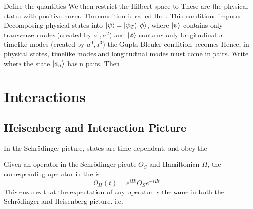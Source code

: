 \documentclass{article}
\begin{document}
\begin{definition}
Define the quantities 
We then restrict the Hilbert space to 
These are the physical states with positive norm. The condition is called the . This conditions imposes 
Decomposing physical states into $\ket{\psi} = \ket{\psi_T}\ket{\phi}$, where $\ket{\psi}$ contains only transverse modes (created by $a^1,a^2$) and $\ket{\phi}$ contains only longitudinal or timelike modes (created by $a^0,a^3$) the Gupta Bleuler condition becomes 
Hence, in physical states, timelike modes and longitudinal modes must come in pairs. Write 
where the state $\ket{\phi_n}$ has n pairs. Then 
\end{definition}

\section{Interactions}

\subsection{Heisenberg and Interaction Picture}

\begin{definition}
In the Schr\"odinger picture, states are time dependent, and obey the 
\end{definition}

\begin{definition}
Given an operator in the Schr\"odinger picute $O_S$ and Hamiltonian $H$, the corresponding operator in the  is 
\[
O_H (t) = e^{iHt} O_S e^{-iHt}
\]
This ensures that the expectation of any operator is the same in both the Schr\"odinger and Heisenberg picture. i.e.
\end{definition}
\end{document}
